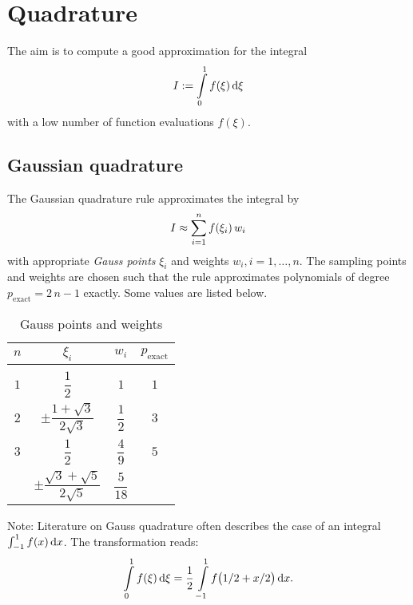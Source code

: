 \section{Quadrature}

The aim is to compute a good approximation for the integral
%
\begin{equation*}
  \begin{array}{lll}
    I := \i{0}{1}f(\xi)\,\d \xi
  \end{array}
\end{equation*}
with a low number of function evaluations $f(\xi)$. 
\subsection{Gaussian quadrature}
The Gaussian quadrature rule approximates the integral by
%
\begin{equation*}
  \begin{array}{lll}
    I \approx \displaystyle\sum\limits_{i=1}^{n}f(\xi_i)\,w_i
  \end{array}
\end{equation*}
with appropriate \emph{Gauss points} $\xi_i$ and weights $w_i, i=1,\dots,n$. The sampling points and weights are chosen such that the rule approximates polynomials of degree $p_\text{exact}=2\,n-1$ exactly. Some values are listed below. 

\begin{table}[ht]
\centering
\begin{tabular}{c|c|c|c}
    $n$& $\xi_i$& $w_i$ & $p_\text{exact}$\\[4mm]
    \hline&&\\[-4mm]
    $1$& $\dfrac12$ & $1$ & $1$\\[4mm]
    \hline
    $2$& $\pm \dfrac{1+\sqrt{3}}{2\sqrt{3}}$ & $\dfrac12$ & $3$\\[4mm]
    \hline
    $3$& $\dfrac12$ & $\dfrac49$ & $5$ \\[4mm]
     & $\pm \dfrac{\sqrt{3}+\sqrt{5}}{2\sqrt{5}}$ & $\dfrac{5}{18}$ &
\end{tabular}
\caption{Gauss points and weights}
\end{table}

Note: Literature on Gauss quadrature often describes the case of an integral $\int_{-1}^{1} f(x) \,\d x$. The transformation reads:
%
\begin{equation*}
  \begin{array}{lll}
    \i{0}{1} f(\xi) \,\d \xi = \dfrac12 \i{-1}{1} f\big(1/2+x/2\big) \,\d x.
  \end{array}
\end{equation*}

